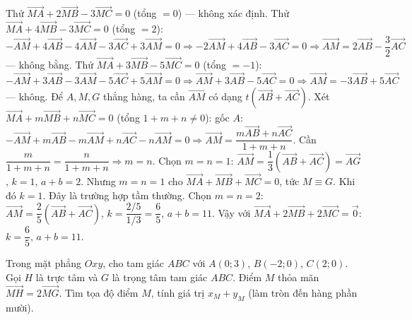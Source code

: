 \begin{bt}
{Thử $\overrightarrow{MA}+2\overrightarrow{MB}-3\overrightarrow{MC}=0$ (tổng $=0$) — không xác định.
Thử $\overrightarrow{MA}+4\overrightarrow{MB}-3\overrightarrow{MC}=0$ (tổng $=2$): $-\overrightarrow{AM}+4\overrightarrow{AB}-4\overrightarrow{AM}-3\overrightarrow{AC}+3\overrightarrow{AM}=0\Rightarrow-2\overrightarrow{AM}+4\overrightarrow{AB}-3\overrightarrow{AC}=0\Rightarrow\overrightarrow{AM}=2\overrightarrow{AB}-\dfrac32\overrightarrow{AC}$ — không bằng.
Thử $\overrightarrow{MA}+3\overrightarrow{MB}-5\overrightarrow{MC}=0$ (tổng $=-1$): $-\overrightarrow{AM}+3\overrightarrow{AB}-3\overrightarrow{AM}-5\overrightarrow{AC}+5\overrightarrow{AM}=0\Rightarrow\overrightarrow{AM}+3\overrightarrow{AB}-5\overrightarrow{AC}=0\Rightarrow\overrightarrow{AM}=-3\overrightarrow{AB}+5\overrightarrow{AC}$ — không.
Để $A,M,G$ thẳng hàng, ta cần $\overrightarrow{AM}$ có dạng $t(\overrightarrow{AB}+\overrightarrow{AC})$. Xét $\overrightarrow{MA}+m\overrightarrow{MB}+n\overrightarrow{MC}=0$ (tổng $1+m+n\neq0$): gốc $A$: $-\overrightarrow{AM}+m\overrightarrow{AB}-m\overrightarrow{AM}+n\overrightarrow{AC}-n\overrightarrow{AM}=0\Rightarrow\overrightarrow{AM}=\dfrac{m\overrightarrow{AB}+n\overrightarrow{AC}}{1+m+n}$.
Cần $\dfrac{m}{1+m+n}=\dfrac{n}{1+m+n}\Rightarrow m=n$. Chọn $m=n=1$: $\overrightarrow{AM}=\dfrac13(\overrightarrow{AB}+\overrightarrow{AC})=\overrightarrow{AG}$, $k=1$, $a+b=2$.
Nhưng $m=n=1$ cho $\overrightarrow{MA}+\overrightarrow{MB}+\overrightarrow{MC}=0$, tức $M\equiv G$. Khi đó $k=1$. Đây là trường hợp tầm thường.
Chọn $m=n=2$: $\overrightarrow{AM}=\dfrac{2}{5}(\overrightarrow{AB}+\overrightarrow{AC})$, $k=\dfrac{2/5}{1/3}=\dfrac65$, $a+b=11$.
Vậy với $\overrightarrow{MA}+2\overrightarrow{MB}+2\overrightarrow{MC}=\overrightarrow{0}$: $k=\dfrac65$, $a+b=11$.
}

\end{bt}

\begin{bt}%
Trong mặt phẳng $Oxy$, cho tam giác $ABC$ với $A(0;3)$, $B(-2;0)$, $C(2;0)$. Gọi $H$ là trực tâm và $G$ là trọng tâm tam giác $ABC$. Điểm $M$ thỏa mãn $\overrightarrow{MH}=2\overrightarrow{MG}$. Tìm tọa độ điểm $M$, tính giá trị $x_M+y_M$ (làm tròn đến hàng phần mười).

\end{bt}

